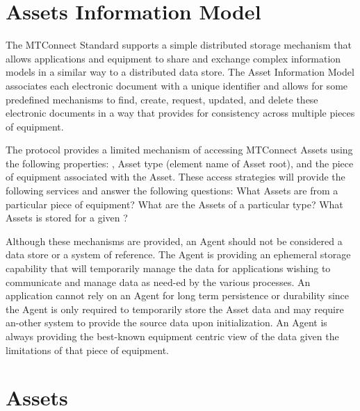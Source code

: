 
\section{Assets Information Model}
\label{sec:Assets Information Model}

The MTConnect Standard supports a simple distributed storage mechanism that allows applications and equipment to share and exchange complex information models in a similar way to a distributed data store.  The \gls{Asset Information Model} associates each electronic  document with a unique identifier and allows for some predefined mechanisms to find, create, request, updated, and delete these electronic documents in a way that provides for consistency across multiple pieces of equipment.

The protocol provides a limited mechanism of accessing \gls{MTConnect Assets} using the following properties: , \gls{Asset} type (element name of \gls{Asset} root), and the piece of equipment associated with the \gls{Asset}.  These access strategies will provide the following services and answer the following questions: What \glspl{Asset} are from a particular piece of equipment?  What are the \glspl{Asset} of a particular type? What \glspl{Asset} is stored for a given ?

Although these mechanisms are provided, an \gls{Agent} should not be considered a data store or a system of reference.  The \gls{Agent} is providing an ephemeral storage capability that will temporarily manage the data for applications wishing to communicate and manage data as need-ed by the various processes.  An application cannot rely on an \gls{Agent} for long term persistence or durability since the \gls{Agent} is only required to temporarily store the \gls{Asset} data and may require an-other system to provide the source data upon initialization.  An \gls{Agent} is always providing the best-known equipment centric view of the data given the limitations of that piece of equipment.

\section{Assets}
\label{sec:Assets}









